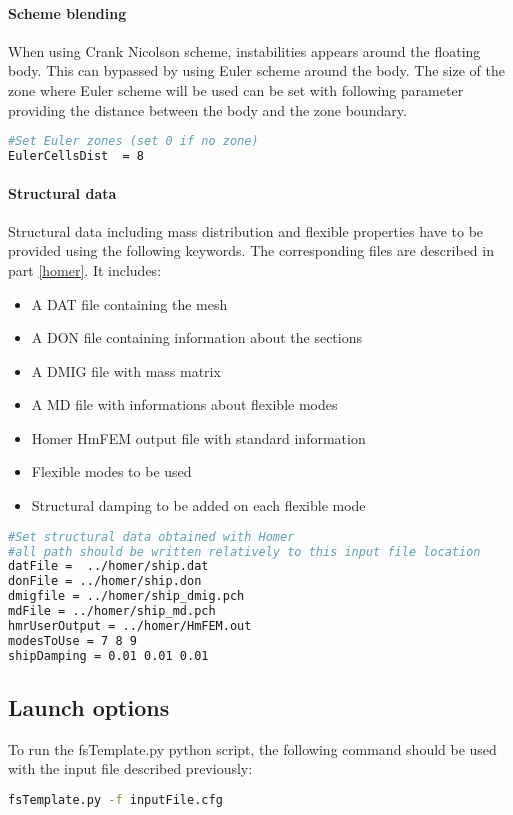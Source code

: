 \paragraph{Scheme blending}
When using Crank Nicolson scheme, instabilities appears around the floating body. This can bypassed by using Euler scheme around the body. The size of the zone where Euler scheme will be used can be set with following parameter providing the distance between the body and the zone boundary.
\begin{lstlisting}[language=bash]
#Set Euler zones (set 0 if no zone)
EulerCellsDist  = 8
\end{lstlisting}

\paragraph{Structural data}
Structural data including mass distribution and flexible properties have to be provided using the following keywords. The corresponding files are described in part \ref{homer}.  It includes:
\begin{itemize}
\item A DAT file containing the mesh
\item A DON file containing information about the sections
\item A DMIG file with mass matrix
\item A MD file with informations about flexible modes
\item Homer HmFEM output file with standard information
\item Flexible modes to be used
\item Structural damping to be added on each flexible mode
\end{itemize}

\begin{lstlisting}[language=bash]
#Set structural data obtained with Homer
#all path should be written relatively to this input file location
datFile =  ../homer/ship.dat
donFile = ../homer/ship.don
dmigfile = ../homer/ship_dmig.pch
mdFile = ../homer/ship_md.pch
hmrUserOutput = ../homer/HmFEM.out
modesToUse = 7 8 9
shipDamping = 0.01 0.01 0.01
\end{lstlisting}


\subsection{Launch options}

To run the fsTemplate.py python script, the following command should be used with the input file described previously:
\begin{lstlisting}[language=bash]
fsTemplate.py -f inputFile.cfg
\end{lstlisting}

